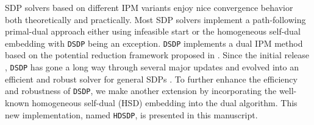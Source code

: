 SDP solvers based on different IPM variants enjoy nice convergence behavior
both theoretically and practically. Most SDP solvers implement a
path-following primal-dual approach either using infeasible start
{\cite{potra1998superlinearly}} or the homogeneous self-dual embedding
{\cite{potra1998homogeneous}} with {{\texttt{DSDP}}} being an exception.
{{\texttt{DSDP}}} implements a dual IPM method based on the potential reduction framework 
proposed in {\cite{benson1999mixed}}.
Since the initial release {\cite{benson2000solving}}, {{\texttt{DSDP}}} has
gone a long way through several major updates and evolved into an
efficient and robust solver for general SDPs {\cite{benson2008algorithm}}.
To further enhance the efficiency and robustness of {{\texttt{DSDP}}}, we make
another extension by incorporating the well-known homogeneous self-dual (HSD)
embedding into the dual algorithm. This new implementation, named
{{\texttt{HDSDP}}}, is presented in this manuscript.\\

